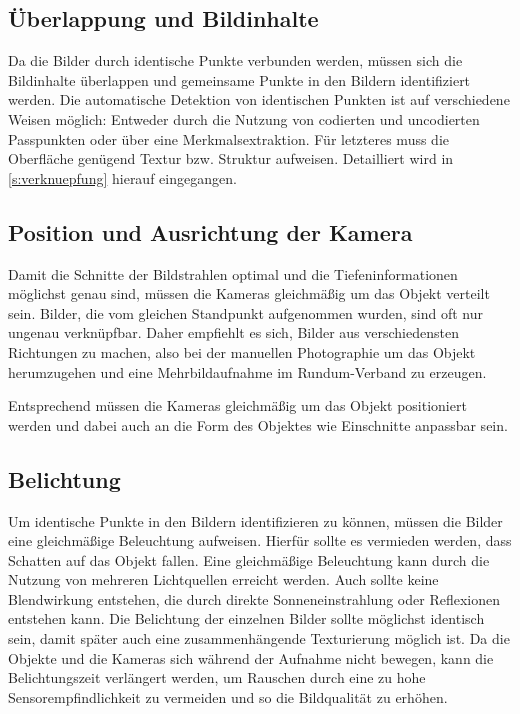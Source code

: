 \documentclass[./00PhotoBox.tex]{subfiles}
\begin{document}
\subsection{Überlappung und Bildinhalte}
Da die Bilder durch identische Punkte verbunden werden, müssen sich die Bildinhalte überlappen und gemeinsame Punkte in den Bildern identifiziert werden. Die au\-to\-ma\-tische Detektion von identischen Punkten ist auf verschiedene Weisen möglich: Entweder durch die Nutzung von codierten und uncodierten Passpunkten oder über eine Merk\-mals\-ex\-trak\-tion. Für letzteres muss die Oberfläche genügend Textur bzw. Struktur aufweisen. Detailliert wird in \autoref{s:verknuepfung} hierauf eingegangen. \citep[vgl.][S. 478]{luhmann}

\subsection{Position und Ausrichtung der Kamera}
Damit die Schnitte der Bildstrahlen optimal und die Tiefeninformationen möglichst genau sind, müssen die Kameras gleichmäßig um das Objekt verteilt sein.
Bilder, die vom gleichen Standpunkt aufgenommen wurden, sind oft nur ungenau verknüpfbar. Daher empfiehlt es sich, Bilder aus verschiedensten Richtungen zu machen, also bei der manuellen Photographie um das Objekt herumzugehen und eine Mehrbildaufnahme im Rundum-Verband zu erzeugen. \citep[vgl.][S. 170]{luhmann}

Entsprechend müssen die Kameras gleichmäßig um das Objekt positioniert werden und dabei auch an die Form des Objektes wie Einschnitte anpassbar sein.

\subsection{Belichtung}
Um identische Punkte in den Bildern identifizieren zu können, müssen die Bilder eine gleichmäßige Beleuchtung aufweisen. Hierfür sollte es vermieden werden, dass Schatten auf das Objekt fallen. Eine gleichmäßige Beleuchtung kann durch die Nutzung von mehreren Lichtquellen erreicht werden. Auch sollte keine Blendwirkung entstehen, die durch direkte Sonneneinstrahlung oder Reflexionen entstehen kann. Die Belichtung der einzelnen Bilder sollte möglichst identisch sein, damit später auch eine zusammenhängende Texturierung möglich ist.
Da die Objekte und die Kameras sich während der Aufnahme nicht bewegen, kann die Belichtungszeit verlängert werden, um Rauschen durch eine zu hohe Sensorempfindlichkeit zu vermeiden und so die Bildqualität zu erhöhen.
\end{document}
